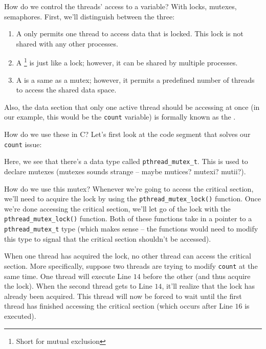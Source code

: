 How do we control the threads' access to a variable? With locks, mutexes, semaphores. First, we'll distinguish between the three:

\begin{enumerate}
\item A  only permits one thread to access data that is locked. This lock is not shared with any other processes.
\item A \footnote{Short for mutual exclusion} is just like a lock; however, it can be shared by multiple processes.
\item A  is a same as a mutex; however, it permits a predefined number of threads to access the shared data space.
\end{enumerate}

Also, the data section that only one active thread should be accessing at once (in our example, this would be the \verb!count! variable) is formally known as the . 

How do we use these in C? Let's first look at the code segment that solves our \verb!count! issue:

\lstset{caption=Accessing Critical Section with Synchronization}
\begin{center}

\end{center}


Here, we see that there's a data type called \verb!pthread_mutex_t!. This is used to declare mutexes (mutexes sounds strange -- maybe mutices? mutexi? mutii?). 

How do we use this mutex? Whenever we're going to access the critical section, we'll need to acquire the lock by using the \verb!pthread_mutex_lock()! function. Once we're done accessing the critical section, we'll let go of the lock with the \verb!pthread_mutex_lock()! function. Both of these functions take in a pointer to a \verb!pthread_mutex_t! type (which makes sense -- the functions would need to modify this type to signal that the critical section shouldn't be accessed).

When one thread has acquired the lock, no other thread can access the critical section. More specifically, suppose two threads are trying to modify \verb!count! at the same time. One thread will execute Line $14$ before the other (and thus acquire the lock). When the second thread gets to Line $14$, it'll realize that the lock has already been acquired. This thread will now be forced to wait until the first thread has finished accessing the critical section (which occurs after Line $16$ is executed). 


